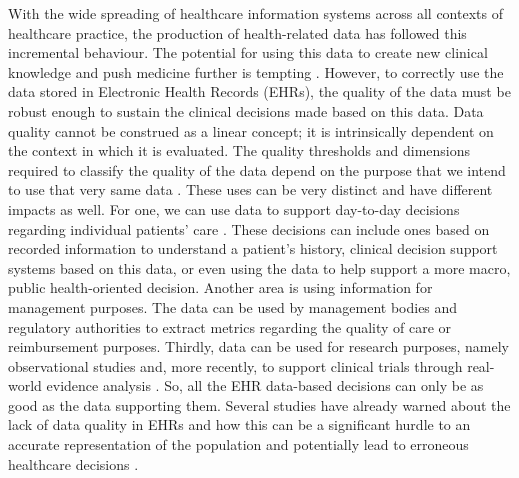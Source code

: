 With the wide spreading of healthcare information systems across all contexts of healthcare practice, the production of health-related data has followed this incremental behaviour. The potential for using this data to create new clinical knowledge and push medicine further is tempting \cite{martin-sanchezBigDataMedicine2014}.
However, to correctly use the data stored in Electronic Health Records (EHRs), the quality of the data must be robust enough to sustain the clinical decisions made based on this data. Data quality cannot be construed as a linear concept; it is intrinsically dependent on the context in which it is evaluated. The quality thresholds and dimensions required to classify the quality of the data depend on the purpose that we intend to use that very same data \cite{waljiElectronicHealthRecords2019}. These uses can be very distinct and have different impacts as well. For one, we can use data to support day-to-day decisions regarding individual patients' care \cite{verheijPossibleSourcesBias2018}. These decisions can include ones based on recorded information to understand a patient's history, clinical decision support systems based on this data, or even using the data to help support a more macro, public health-oriented decision. Another area is using information for management purposes. The data can be used by management bodies and regulatory authorities to extract metrics regarding the quality of care or reimbursement purposes. Thirdly, data can be used for research purposes, namely observational studies and, more recently, to support clinical trials through real-world evidence analysis \cite{coreyAssessingQualitySurgical2020,verheijPossibleSourcesBias2018,wengClinicalDataQuality2020}. 
So, all the EHR data-based decisions can only be as good as the data supporting them. Several studies have already warned about the lack of data quality in EHRs and how this can be a significant hurdle to an accurate representation of the population and potentially lead to erroneous healthcare decisions \cite{reimerDataQualityAssessment2016a,joukesImpactElectronicPaperBased2019a,huserMultisiteEvaluationData2016,zhangUnderstandingDetectingDefects2020,kramerImpactDataQuality2021,gigantiImpactDataQuality2019}.

